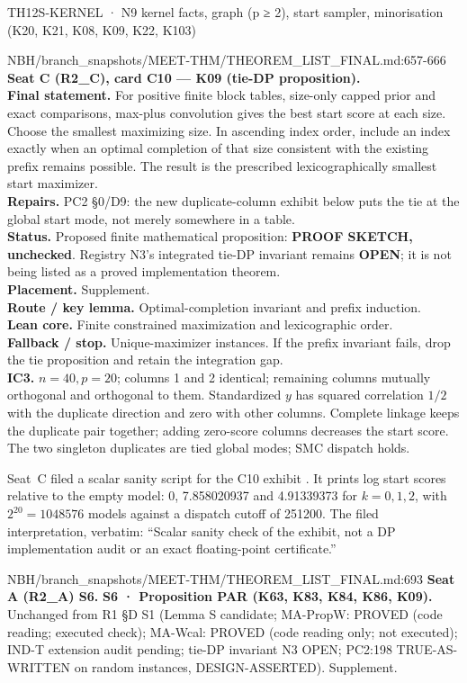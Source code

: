 \begin{card}{TH12}{S-KERNEL · N9 kernel facts, graph (p ≥ 2), start sampler, minorisation (K20, K21, K08, K09, K22, K103)}
\begin{stmt}{NBH/branch_snapshots/MEET-THM/THEOREM_LIST_FINAL.md:657-666}
\textbf{Seat C (R2\_C), card C10 — K09 (tie-DP proposition).}\\
\textbf{Final statement.} For positive finite block tables, size-only capped prior and exact comparisons, max-plus convolution gives the best start score at each size. Choose the smallest maximizing size. In ascending index order, include an index exactly when an optimal completion of that size consistent with the existing prefix remains possible. The result is the prescribed lexicographically smallest start maximizer.\\
\textbf{Repairs.} PC2 §0/D9: the new duplicate-column exhibit below puts the tie at the global start mode, not merely somewhere in a table.\\
\textbf{Status.} Proposed finite mathematical proposition: \textbf{PROOF SKETCH, unchecked}. Registry N3’s integrated tie-DP invariant remains \textbf{OPEN}; it is not being listed as a proved implementation theorem.\\
\textbf{Placement.} Supplement.\\
\textbf{Route / key lemma.} Optimal-completion invariant and prefix induction.\\
\textbf{Lean core.} Finite constrained maximization and lexicographic order.\\
\textbf{Fallback / stop.} Unique-maximizer instances. If the prefix invariant fails, drop the tie proposition and retain the integration gap.\\
\textbf{IC3.} $n=40,p=20$; columns 1 and 2 identical; remaining columns mutually orthogonal and orthogonal to them. Standardized $y$ has squared correlation $1/2$ with the duplicate direction and zero with other columns. Complete linkage keeps the duplicate pair together; adding zero-score columns decreases the start score. The two singleton duplicates are tied global modes; SMC dispatch holds.
\end{stmt}
Seat~C filed a scalar sanity script for the C10 exhibit . It prints log start scores relative to the empty model: 0, 7.858020937 and 4.91339373 for $k=0,1,2$, with $2^{20}=1048576$ models against a dispatch cutoff of 251200. The filed interpretation, verbatim: ``Scalar sanity check of the exhibit, not a DP implementation audit or an exact floating-point certificate.''

\begin{stmt}{NBH/branch_snapshots/MEET-THM/THEOREM_LIST_FINAL.md:693}
\textbf{Seat A (R2\_A) S6.} \textbf{S6 · Proposition PAR (K63, K83, K84, K86, K09).} Unchanged from R1 §D S1 (Lemma S candidate; MA-PropW: PROVED (code reading; executed check); MA-Wcal: PROVED (code reading only; not executed); IND-T extension audit pending; tie-DP invariant N3 OPEN; PC2:198 TRUE-AS-WRITTEN on random instances, DESIGN-ASSERTED). Supplement.
\end{stmt}


\end{card}
